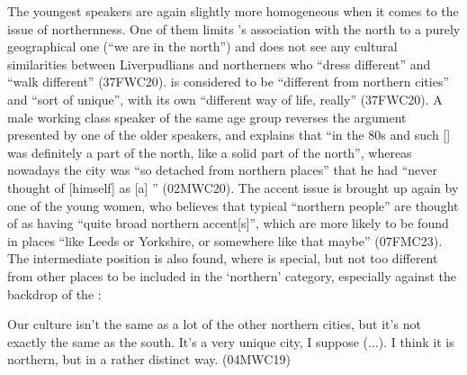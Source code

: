 The youngest speakers are again slightly more homogeneous when it comes to the issue of northernness.
One of them limits 's association with the north to a purely geographical one (``we are in the north'') and does not see any cultural similarities between Liverpudlians and northerners who ``dress different'' and ``walk different'' (37FWC20).
 is considered to be ``different from northern cities'' and ``sort of unique'', with its own ``different way of life, really'' (37FWC20).
A male working class speaker of the same age group reverses the argument presented by one of the older speakers, and explains that ``in the 80s and such [] was definitely a part of the north, like a solid part of the north'', whereas nowadays the city was ``so detached from northern places'' that he had ``never thought of [himself] as [a] '' (02MWC20).
The accent issue is brought up again by one of the young women, who believes that typical ``northern people'' are thought of as having ``quite broad northern accent[s]'', which are more likely to be found in places ``like Leeds or Yorkshire, or somewhere like that maybe'' (07FMC23).
The intermediate position is also found, where  is special, but not too different from other places to be included in the `northern' category, especially against the backdrop of the :
\begin{example}
	Our culture isn't the same as a lot of the other northern cities, but it's not exactly the same as the south.
	It's a very unique city, I suppose (...).
	I think it is northern, but in a rather distinct way. (04MWC19)
\end{example}

